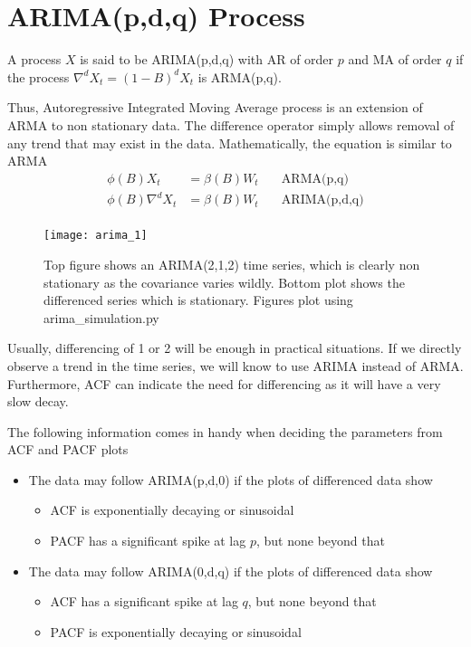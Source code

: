 \documentclass[../../time_series_notes.tex]{subfiles}
\begin{document}
\section{ARIMA(p,d,q) Process}
A process $X$ is said to be ARIMA(p,d,q) with AR of order $p$ and MA of order $q$ if the process $\nabla^{d}X_{t} = (1-B)^{d}X_{t}$ is ARMA(p,q).\newline

Thus, Autoregressive Integrated Moving Average process is an extension of ARMA to non stationary data. The difference operator simply allows removal of any trend that may exist in the data. Mathematically, the equation is similar to ARMA
\begin{align*}
    \phi(B)X_{t} &= \beta(B)W_{t} \quad &\mbox{ARMA(p,q)}\\
    \phi(B)\nabla^{d}X_{t} &= \beta(B)W_{t} \quad &\mbox{ARIMA(p,d,q)}\\
\end{align*}

\begin{figure}[h]
    \texttt{[image: arima\_1]}
    \centering
    \caption {Top figure shows an ARIMA(2,1,2) time series, which is clearly non stationary as the covariance varies wildly. Bottom plot shows the differenced series which is stationary. Figures plot using arima\_simulation.py}
    \label{fig:arima_1} %
\end{figure}

Usually, differencing of 1 or 2 will be enough in practical situations. If we directly observe a trend in the time series, we will know to use ARIMA instead of ARMA. Furthermore, ACF can indicate the need for differencing as it will have a very slow decay.\newline

The following information comes in handy when deciding the parameters from ACF and PACF plots
\begin{itemize}
    \item The data may follow ARIMA(p,d,0) if the plots of differenced data show
    \begin{itemize}
        \item ACF is exponentially decaying or sinusoidal
        \item PACF has a significant spike at lag $p$, but none beyond that
    \end{itemize}
    \item The data may follow ARIMA(0,d,q) if the plots of differenced data show
    \begin{itemize}
        \item ACF has a significant spike at lag $q$, but none beyond that
        \item PACF is exponentially decaying or sinusoidal
    \end{itemize}
\end{itemize}
\end{document}
